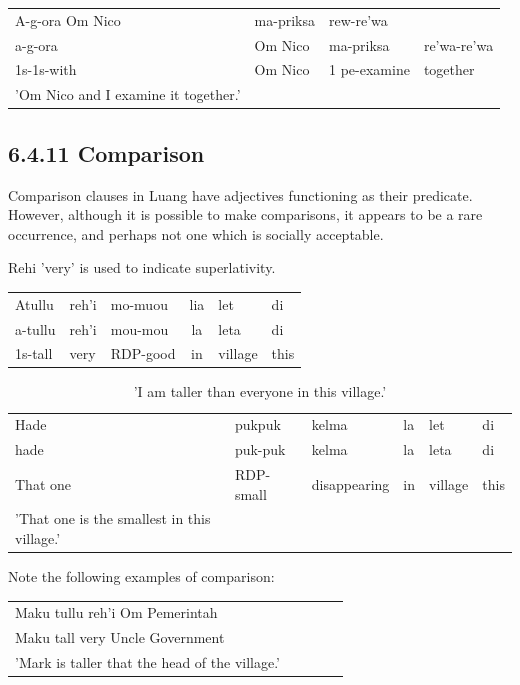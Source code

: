 \documentclass[10pt]{article}
\begin{document}
\begin{center}
\begin{tabular}{llll}
A-g-ora Om Nico & ma-priksa & rew-re'wa &  \\
a-g-ora & Om Nico & ma-priksa & re'wa-re'wa \\
1s-1s-with & Om Nico & 1 pe-examine & together \\
'Om Nico and I examine it together.' &  &  &  \\
\end{tabular}
\end{center}

\subsection*{6.4.11 Comparison}
Comparison clauses in Luang have adjectives functioning as their predicate. However, although it is possible to make comparisons, it appears to be a rare occurrence, and perhaps not one which is socially acceptable.

Rehi 'very' is used to indicate superlativity.

\begin{center}
\begin{tabular}{lllcll}
Atullu & reh'i & mo-muou & lia & let & di \\
a-tullu & reh'i & mou-mou & la & leta & di \\
1s-tall & very & RDP-good & in & village & this \\
\end{tabular}
\end{center}

\begin{table}[h]
\begin{center}
\captionsetup{labelformat=empty}
\caption{'I am taller than everyone in this village.'}
\begin{tabular}{llllll}
Hade & pukpuk & kelma & la & let & di \\
hade & puk-puk & kelma & la & leta & di \\
That one & RDP-small & disappearing & in & village & this \\
'That one is the smallest in this village.' &  &  &  &  &  \\
\end{tabular}
\end{center}
\end{table}

Note the following examples of comparison:

\begin{center}
\begin{tabular}{lcccc}
Maku tullu reh'i Om Pemerintah &  \\
Maku tall very Uncle Government &  \\
'Mark is taller that the head of the village.' &  \\
\end{tabular}
\end{center}
\end{document}
